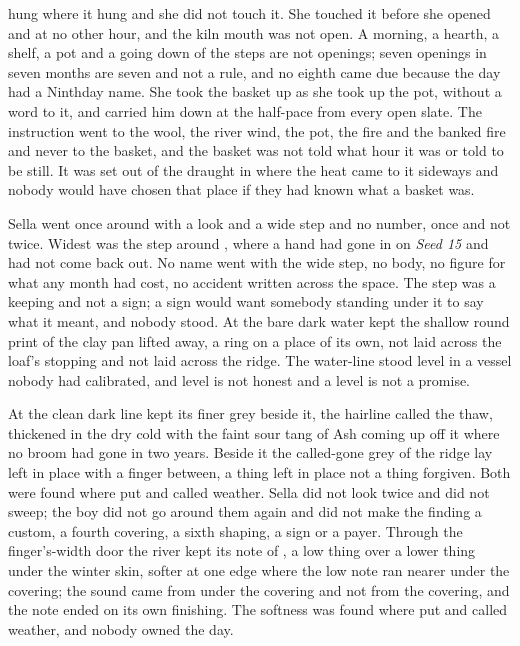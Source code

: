  hung where it hung and she did not touch it. She touched it before she opened  and at no other hour, and the kiln mouth was not open. A morning, a hearth, a shelf, a pot and a going down of the steps are not openings; seven openings in seven months are seven and not a rule, and no eighth came due because the day had a Ninthday name. She took the basket up as she took up the pot, without a word to it, and carried him down  at the half-pace from every open slate. The instruction went to the wool, the river wind, the pot, the fire and the banked fire and never to the basket, and the basket was not told what hour it was or told to be still. It was set out of the draught in  where the heat came to it sideways and nobody would have chosen that place if they had known what a basket was.

Sella went once around  with a look and a wide step and no number, once and not twice. Widest was the step around , where a hand had gone in on \emph{Seed 15} and had not come back out. No name went with the wide step, no body, no figure for what any month had cost, no accident written across the space. The step was a keeping and not a sign; a sign would want somebody standing under it to say what it meant, and nobody stood. At  the bare dark water kept the shallow round print of the clay pan lifted away, a ring on a place of its own, not laid across the loaf's stopping and not laid across the ridge. The water-line stood level in a vessel nobody had calibrated, and level is not honest and a level is not a promise.

At  the clean dark line kept its finer grey beside it, the hairline called the thaw, thickened in the dry cold with the faint sour tang of Ash coming up off it where no broom had gone in two years. Beside it the called-gone grey of the ridge lay left in place with a finger between, a thing left in place not a thing forgiven. Both were found where put and called weather. Sella did not look twice and did not sweep; the boy did not go around them again and did not make the finding a custom, a fourth covering, a sixth shaping, a sign or a payer. Through the finger's-width door the river kept its note of , a low thing over a lower thing under the winter skin, softer at one edge where the low note ran nearer under the covering; the sound came from under the covering and not from the covering, and the note ended on its own finishing. The softness was found where put and called weather, and nobody owned the day.

